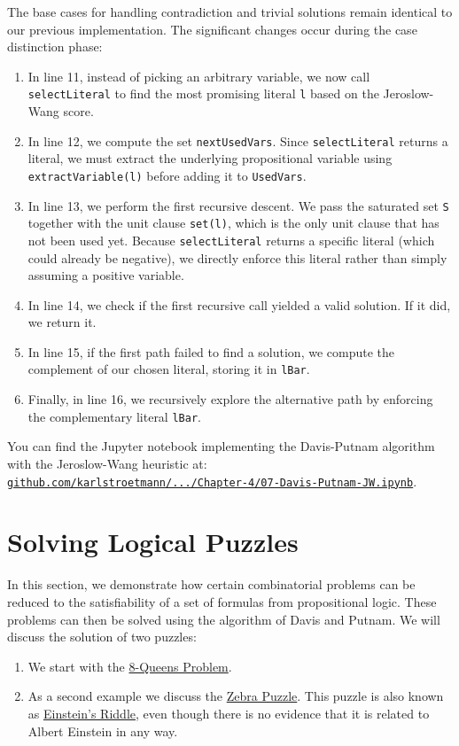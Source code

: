 The base cases for handling contradiction and trivial solutions remain identical to our previous implementation. The significant changes occur during the case distinction phase:
\begin{enumerate}
\item In line 11, instead of picking an arbitrary variable, we now call \texttt{selectLiteral} to find the most
  promising literal \texttt{l} based on the Jeroslow-Wang score.
\item In line 12, we compute the set \texttt{nextUsedVars}. Since \texttt{selectLiteral} returns a literal, we must extract the underlying propositional variable using \texttt{extractVariable(l)} before adding it to \texttt{UsedVars}.
\item In line 13, we perform the first recursive descent. We pass the saturated set \texttt{S} together with the
  unit clause \texttt{set(l)}, which is the only unit clause that has not been used yet. Because \texttt{selectLiteral} returns a specific literal (which could already be negative), we directly enforce this literal rather than simply assuming a positive variable.
\item In line 14, we check if the first recursive call yielded a valid solution. If it did, we return it.
\item In line 15, if the first path failed to find a solution, we compute the complement of our chosen literal, storing it in \texttt{lBar}.
\item Finally, in line 16, we recursively explore the alternative path by enforcing the complementary literal \texttt{lBar}.
\end{enumerate}
You can find the Jupyter notebook implementing the Davis-Putnam algorithm with the Jeroslow-Wang heuristic at:
\\[0.2cm]
\hspace*{1.3cm}
\href{https://github.com/karlstroetmann/Logic/blob/master/Java/Chapter-4/07-Davis-Putnam-JW.ipynb}{\texttt{github.com/karlstroetmann/.../Chapter-4/07-Davis-Putnam-JW.ipynb}}.


\section{Solving Logical Puzzles}
In this section, we demonstrate how certain combinatorial problems can be reduced to the satisfiability of a
set of formulas from propositional logic.  These problems can then be solved using the algorithm of
Davis and Putnam.  We will discuss the solution of two puzzles:
\begin{enumerate}
\item We start with the
      \href{https://en.wikipedia.org/wiki/Eight_queens_puzzle}{8-Queens Problem}. 
\item As a second example we discuss the
      \href{https://en.wikipedia.org/wiki/Zebra_puzzle}{Zebra Puzzle}.  This puzzle is also known as
      \href{https://www.brainzilla.com/logic/zebra/einsteins-riddle/}{Einstein's Riddle},
      even though there is no evidence that it is related to Albert Einstein in any way.
\end{enumerate}

